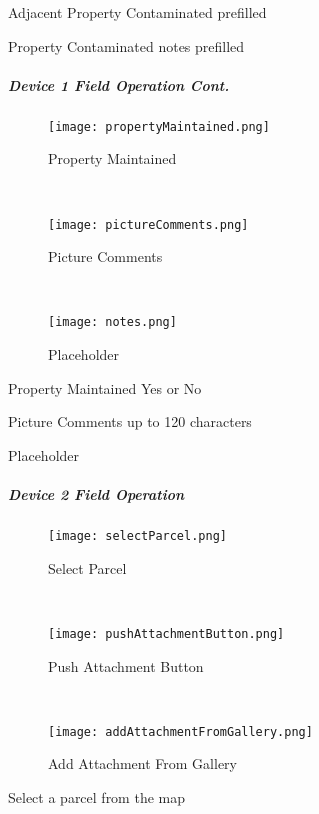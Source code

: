 \noindent Adjacent Property Contaminated prefilled
\vspace{2in}

\noindent Property Contaminated notes prefilled
\clearpage
\subparagraph*{Device 1 Field Operation Cont.}
\begin{wrapfigure}{r}{0.4\textwidth}
\centering
    \texttt{[image: propertyMaintained.png]}
\caption {Property Maintained}
\vspace{.1in}

\HRule \\[.4cm] %
\vspace{.1in}

    \texttt{[image: pictureComments.png]}
\caption{Picture Comments}
\vspace{.1in}

\HRule \\[.4cm] %
\vspace{.1in}

    \texttt{[image: notes.png]}
\caption{Placeholder}
\end{wrapfigure}
Property Maintained Yes or No
\vspace{2.5in}

\noindent Picture Comments up to 120 characters
\vspace{2.5in}

\noindent Placeholder
\clearpage
\subparagraph{Device 2 Field Operation}
\begin{wrapfigure}{r}{0.4\textwidth}
\centering
    \texttt{[image: selectParcel.png]}
\caption {Select Parcel}
\vspace{.1in}

\HRule \\[.4cm] %
\vspace{.1in}

    \texttt{[image: pushAttachmentButton.png]}
\caption{Push Attachment Button}
\vspace{.1in}

\HRule \\[.4cm] %
\vspace{.05in}

    \texttt{[image: addAttachmentFromGallery.png]}
\caption{Add Attachment From Gallery}
\end{wrapfigure}
Select a parcel from the map
\vspace{2in}

